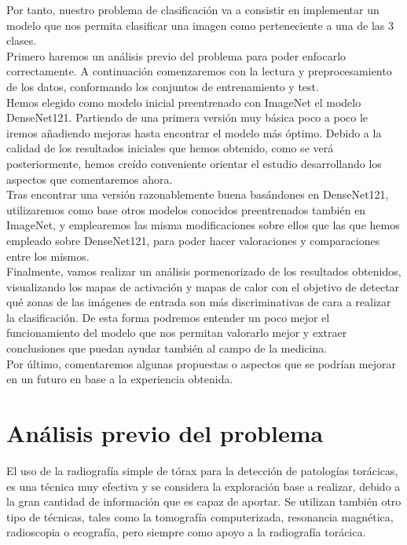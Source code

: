 \documentclass[11pt,a4paper]{article}
\theoremstyle{definition}
\begin{document}
Por tanto, nuestro problema de clasificación va a consistir en implementar un modelo que nos permita clasificar una imagen como perteneciente a una de las 3 clases.\\

Primero haremos un análisis previo del problema para poder enfocarlo correctamente. A continuación comenzaremos con la lectura y preprocesamiento de los datos, conformando los conjuntos de entrenamiento y test.\\

Hemos elegido como modelo inicial preentrenado con ImageNet el modelo DenseNet121. Partiendo de una primera versión muy básica poco a poco le iremos añadiendo mejoras hasta encontrar el modelo más óptimo. Debido a la calidad de los resultados iniciales que hemos obtenido, como se verá posteriormente,  hemos creído conveniente orientar el estudio desarrollando los aspectos que comentaremos ahora.\\

Tras encontrar una versión razonablemente buena basándones en DenseNet121,  utilizaremos como base otros modelos conocidos preentrenados también en ImageNet, y emplearemos las misma modificaciones sobre ellos que las que hemos empleado sobre DenseNet121, para poder hacer valoraciones y comparaciones entre los mismos.\\

Finalmente, vamos realizar un análisis pormenorizado de los resultados obtenidos, visualizando los mapas de activación y mapas de calor con el objetivo de detectar qué zonas de las imágenes de entrada son más discriminativas de cara a realizar la clasificación. De esta forma podremos entender un poco mejor el funcionamiento del modelo que nos permitan valorarlo mejor y extraer conclusiones que puedan ayudar también al campo de la medicina.\\

Por último, comentaremos algunas propuestas o aspectos que se podrían mejorar en un futuro en base a la experiencia obtenida.\\

\newpage

\section{Análisis previo del problema}

El uso de la radiografía simple de tórax para la detección de patologías torácicas,  es una técnica muy efectiva y se considera la exploración base a realizar, debido a la gran cantidad de información que es capaz de aportar.  Se utilizan también otro tipo de técnicas,  tales como la tomografía computerizada,  resonancia magnética, radioscopia o ecografía, pero siempre como apoyo a la radiografía torácica.\\
\end{document}
